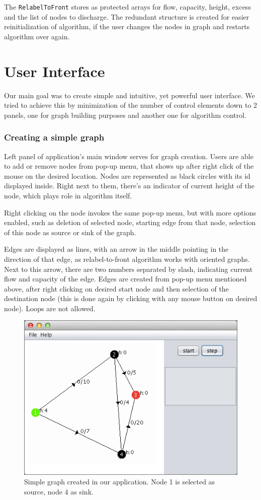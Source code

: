 \documentclass[a4paper,11pt]{article}
\begin{document}
The \texttt{RelabelToFront} stores as protected arrays for flow, capacity, height,
excess and the list of nodes to discharge. The redundant structure is created for
easier reinitialization of algorithm, if the user changes the nodes in graph and
restarts algorithm over again.




\section{User Interface}
Our main goal was to create simple and intuitive, yet powerful user interface. 
We tried to achieve this by minimization of the number of control elements down 
to 2 panels, one for graph building purposes and another one for algorithm control.

\subsubsection*{Creating a simple graph}
Left panel of application's main window serves for graph creation. Users are able 
to add or remove nodes from pop-up menu, that shows up after right click of the 
mouse on the desired location. Nodes are represented as black circles with its 
id displayed inside. Right next to them, there's an indicator of current height 
of the node, which plays role in algorithm itself.

Right clicking on the node invokes the same pop-up menu, but with more options 
enabled, such as deletion of selected node, starting edge from that node, selection 
of this node as source or sink of the graph.

Edges are displayed as lines, with an arrow in the middle pointing in the 
direction of that edge, as relabel-to-front algorithm works with oriented graphs. 
Next to this arrow, there are two numbers separated by slash, indicating current 
flow and capacity of the edge. Edges are created from pop-up menu mentioned above, 
after right clicking on desired start node and then selection of the destination 
node (this is done again by clicking with any mouse button on desired node). 
Loops are not allowed.

\begin{figure}[H]
\centering
\includegraphics[width=12cm]{1.png}
\caption{Simple graph created in our application. Node 1 is selected as source, node 4 as sink.}
\label{pic1}
\end{figure}
\end{document}
